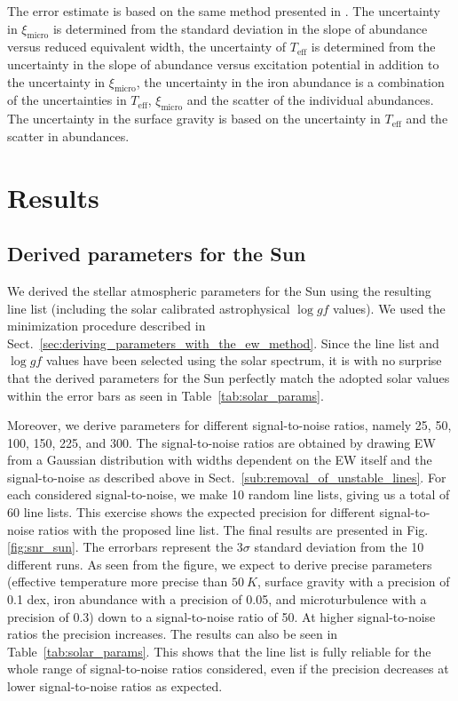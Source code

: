 \documentclass{aa}
\begin{document}
The error estimate is based on the same method presented in
\citet{Gonzalez1998}. The uncertainty in $\xi_\mathrm{micro}$ is
determined from the standard deviation in the slope of abundance
versus reduced equivalent width, the uncertainty of $T_\mathrm{eff}$
is determined from the uncertainty in the slope of abundance
versus excitation potential in addition to the uncertainty in
$\xi_\mathrm{micro}$, the uncertainty in the iron abundance
is a combination of the uncertainties in $T_\mathrm{eff}$,
$\xi_\mathrm{micro}$ and the scatter of the individual 
abundances. The uncertainty in the surface gravity is based on the
uncertainty in $T_\mathrm{eff}$ and the scatter in 
abundances.


\section{Results}
\label{sec:results}

\subsection{Derived parameters for the Sun}
\label{sec:derived_parameters_of_the_sun}

We derived the stellar atmospheric parameters
for the Sun using the resulting line list (including
the solar calibrated astrophysical $\log \mathit{gf}$
values). We used the minimization procedure described in
Sect.~\ref{sec:deriving_parameters_with_the_ew_method}. Since the line
list and $\log\mathit{gf}$ values have been selected using the solar
spectrum, it is with no surprise that the derived parameters for the Sun
perfectly match the adopted solar values within the error bars as seen
in Table~\ref{tab:solar_params}.

Moreover, we derive parameters for different signal-to-noise ratios,
namely 25, 50, 100, 150, 225, and 300. The signal-to-noise ratios are
obtained by drawing EW from a Gaussian distribution with widths
dependent on the EW itself and the signal-to-noise as described above
in Sect.~\ref{sub:removal_of_unstable_lines}. For each considered
signal-to-noise, we make 10 random line lists, giving us a total of 60
line lists. This exercise shows the expected precision for different
signal-to-noise ratios with the proposed line list. The final
results are presented in Fig.\ref{fig:snr_sun}. The errorbars represent the
$3 \sigma$ standard deviation from the 10 different runs. As seen
from the figure, we expect to derive precise parameters
(effective temperature more precise than $\SI{50}{K}$, surface gravity
with a precision of 0.1 dex, iron abundance with a precision of 0.05, and
microturbulence with a precision of 0.3) down to a signal-to-noise
ratio of 50. At higher signal-to-noise ratios the precision
increases. The results can also be seen in Table~\ref{tab:solar_params}.
This shows that the line list is fully reliable for the
whole range of signal-to-noise ratios considered, even if the precision
decreases at lower signal-to-noise ratios as expected.
\end{document}
